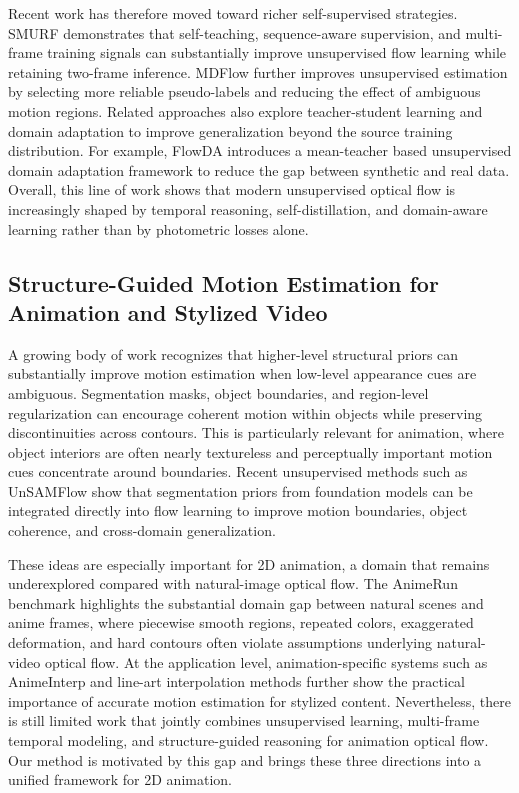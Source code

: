 Recent work has therefore moved toward richer self-supervised strategies. SMURF \cite{smurf} demonstrates that self-teaching, sequence-aware supervision, and multi-frame training signals can substantially improve unsupervised flow learning while retaining two-frame inference. MDFlow \cite{mdflow} further improves unsupervised estimation by selecting more reliable pseudo-labels and reducing the effect of ambiguous motion regions. Related approaches also explore teacher-student learning and domain adaptation to improve generalization beyond the source training distribution. For example, FlowDA \cite{flowda} introduces a mean-teacher based unsupervised domain adaptation framework to reduce the gap between synthetic and real data. Overall, this line of work shows that modern unsupervised optical flow is increasingly shaped by temporal reasoning, self-distillation, and domain-aware learning rather than by photometric losses alone.

\subsection{Structure-Guided Motion Estimation for Animation and Stylized Video}

A growing body of work recognizes that higher-level structural priors can substantially improve motion estimation when low-level appearance cues are ambiguous. Segmentation masks, object boundaries, and region-level regularization can encourage coherent motion within objects while preserving discontinuities across contours. This is particularly relevant for animation, where object interiors are often nearly textureless and perceptually important motion cues concentrate around boundaries. Recent unsupervised methods such as UnSAMFlow \cite{unsamflow} show that segmentation priors from foundation models can be integrated directly into flow learning to improve motion boundaries, object coherence, and cross-domain generalization.

These ideas are especially important for 2D animation, a domain that remains underexplored compared with natural-image optical flow. The AnimeRun benchmark \cite{animerun} highlights the substantial domain gap between natural scenes and anime frames, where piecewise smooth regions, repeated colors, exaggerated deformation, and hard contours often violate assumptions underlying natural-video optical flow. At the application level, animation-specific systems such as AnimeInterp \cite{animeinterp} and line-art interpolation methods \cite{linedrawingFlow} further show the practical importance of accurate motion estimation for stylized content. Nevertheless, there is still limited work that jointly combines unsupervised learning, multi-frame temporal modeling, and structure-guided reasoning for animation optical flow. Our method is motivated by this gap and brings these three directions into a unified framework for 2D animation.

